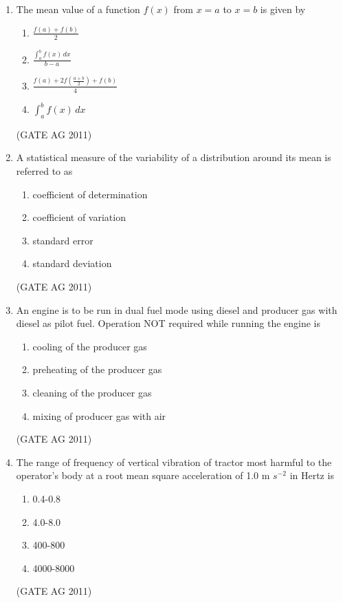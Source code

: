 \documentclass[journal,12pt,onecolumn]{IEEEtran}
\theoremstyle{remark}
\begin{document}
\begin{enumerate}
\item The mean value of a function $f(x)$ from $x=a$ to $x=b$ is given by
\begin{multicols}{2}
\begin{enumerate}
\item $\frac{f(a) + f(b)}{2}$ 
\item $\frac{\int_a^b f(x)\,dx}{b-a}$
\item $\frac{f(a) + 2f\left(\frac{a+b}{2}\right) + f(b)}{4}$ 
 \item $\int_a^b f(x)\,dx$
\end{enumerate}
\end{multicols}
\hfill{(GATE AG 2011)}

\item A statistical measure of the variability of a distribution around its mean is referred to as
\begin{multicols}{4}
\begin{enumerate}
\item coefficient of determination 
\item coefficient of variation
\item standard error 
\item standard deviation
\end{enumerate}
\end{multicols}
\hfill{(GATE AG 2011)}

\item An engine is to be run in dual fuel mode using diesel and producer gas with diesel as pilot fuel. Operation NOT required while running the engine is
\begin{multicols}{4}
\begin{enumerate}
\item cooling of the producer gas 
\item preheating of the producer gas
\item cleaning of the producer gas  
\item mixing of producer gas with air
\end{enumerate}
\end{multicols}
\hfill{(GATE AG 2011)}

\item The range of frequency of vertical vibration of tractor most harmful to the operator's body at a root mean square acceleration of 1.0 m ${s}^{-2}$ in Hertz is
\begin{multicols}{4}
\begin{enumerate}
\item 0.4-0.8 
\item 4.0-8.0  
\item 400-800 
\item 4000-8000
\end{enumerate}
\end{multicols}
\hfill{(GATE AG 2011)}


\end{enumerate}
\end{document}
